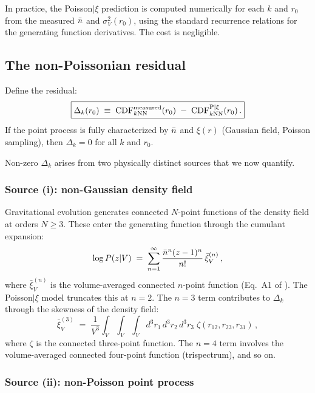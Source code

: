 In practice, the Poisson$|\xi$ prediction is computed numerically for each $k$ and $r_0$ from the measured $\bar{n}$ and $\sigma_V^2(r_0)$, using the standard recurrence relations for the generating function derivatives.  The cost is negligible.

\subsection{The non-Poissonian residual}
\label{sec:residual}

Define the residual:
\begin{equation}
  \boxed{\Delta_k(r_0) \;\equiv\; \mathrm{CDF}^{\mathrm{measured}}_{k\mathrm{NN}}(r_0) \;-\; \mathrm{CDF}^{\mathrm{P}|\xi}_{k\mathrm{NN}}(r_0)\,.}
  \label{eq:residual}
\end{equation}
If the point process is fully characterized by $\bar{n}$ and $\xi(r)$ (Gaussian field, Poisson sampling), then $\Delta_k = 0$ for all $k$ and $r_0$.

Non-zero $\Delta_k$ arises from two physically distinct sources that we now quantify.

\subsubsection{Source (i): non-Gaussian density field}

Gravitational evolution generates connected $N$-point functions of the density field at orders $N \geq 3$.  These enter the generating function through the cumulant expansion:
\begin{equation}
  \log P(z|V) \;=\; \sum_{n=1}^{\infty} \frac{\bar{n}^n(z-1)^n}{n!}\,\bar{\xi}^{(n)}_V\,,
  \label{eq:genfunc_cumulant}
\end{equation}
where $\bar{\xi}^{(n)}_V$ is the volume-averaged connected $n$-point function (Eq.~A1 of \citealt{Banerjee2020}).  The Poisson$|\xi$ model truncates this at $n = 2$.  The $n = 3$ term contributes to $\Delta_k$ through the skewness of the density field:
\begin{equation}
  \bar{\xi}^{(3)}_V \;=\; \frac{1}{V^3}\int_V\!\!\!\int_V\!\!\!\int_V d^3r_1\,d^3r_2\,d^3r_3\;\zeta(r_{12}, r_{23}, r_{31})\,,
  \label{eq:xi3_V}
\end{equation}
where $\zeta$ is the connected three-point function.  The $n = 4$ term involves the volume-averaged connected four-point function (trispectrum), and so on.

\subsubsection{Source (ii): non-Poisson point process}

